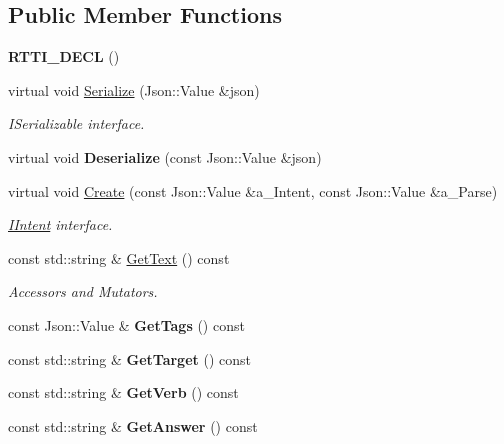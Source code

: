 \subsection*{Public Member Functions}
\begin{DoxyCompactItemize}
\item 
\mbox{\label{class_learning_intent_a98a8f18a8ce8c6b3a1806beff881bbc1}} 
{\bfseries R\+T\+T\+I\+\_\+\+D\+E\+CL} ()
\item 
\mbox{\label{class_learning_intent_aa7d4833adf42e244372c9b2596d5b13a}} 
virtual void \hyperlink{class_learning_intent_aa7d4833adf42e244372c9b2596d5b13a}{Serialize} (Json\+::\+Value \&json)
\begin{DoxyCompactList}\small\item\em I\+Serializable interface. \end{DoxyCompactList}\item 
\mbox{\label{class_learning_intent_aeb9ff364040abc266070bf8f918baac7}} 
virtual void {\bfseries Deserialize} (const Json\+::\+Value \&json)
\item 
\mbox{\label{class_learning_intent_a0b75db8e6f6cfffd35cc516d97225316}} 
virtual void \hyperlink{class_learning_intent_a0b75db8e6f6cfffd35cc516d97225316}{Create} (const Json\+::\+Value \&a\+\_\+\+Intent, const Json\+::\+Value \&a\+\_\+\+Parse)
\begin{DoxyCompactList}\small\item\em \hyperlink{class_i_intent}{I\+Intent} interface. \end{DoxyCompactList}\item 
\mbox{\label{class_learning_intent_ac6c6ee33dc29cccd7c50e795cfcb5654}} 
const std\+::string \& \hyperlink{class_learning_intent_ac6c6ee33dc29cccd7c50e795cfcb5654}{Get\+Text} () const
\begin{DoxyCompactList}\small\item\em Accessors and Mutators. \end{DoxyCompactList}\item 
\mbox{\label{class_learning_intent_a2d40eb04b00dc66114a918b5f9d35f77}} 
const Json\+::\+Value \& {\bfseries Get\+Tags} () const
\item 
\mbox{\label{class_learning_intent_a60cf61fab5395aafd28303ec06715dee}} 
const std\+::string \& {\bfseries Get\+Target} () const
\item 
\mbox{\label{class_learning_intent_a869650ca905800248b97c698893c9ffe}} 
const std\+::string \& {\bfseries Get\+Verb} () const
\item 
\mbox{\label{class_learning_intent_a3a9a96b726b36090dfb5c5486b45a1f4}} 
const std\+::string \& {\bfseries Get\+Answer} () const
\end{DoxyCompactItemize}
